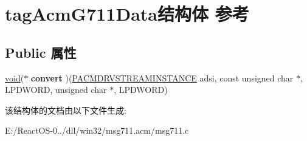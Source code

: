 \hypertarget{structtag_acm_g711_data}{}\section{tag\+Acm\+G711\+Data结构体 参考}
\label{structtag_acm_g711_data}
\subsection*{Public 属性}
\begin{DoxyCompactItemize}
\item 
\mbox{\label{structtag_acm_g711_data_af4e55e0756833b1bcb8776df0ce9d895}} 
\hyperlink{interfacevoid}{void}($\ast$ {\bfseries convert} )(\hyperlink{struct___a_c_m_d_r_v_s_t_r_e_a_m_i_n_s_t_a_n_c_e}{P\+A\+C\+M\+D\+R\+V\+S\+T\+R\+E\+A\+M\+I\+N\+S\+T\+A\+N\+CE} adsi, const unsigned char $\ast$, L\+P\+D\+W\+O\+RD, unsigned char $\ast$, L\+P\+D\+W\+O\+RD)
\end{DoxyCompactItemize}


该结构体的文档由以下文件生成\+:\begin{DoxyCompactItemize}
\item 
E\+:/\+React\+O\+S-\/0../dll/win32/msg711.\+acm/msg711.\+c\end{DoxyCompactItemize}
